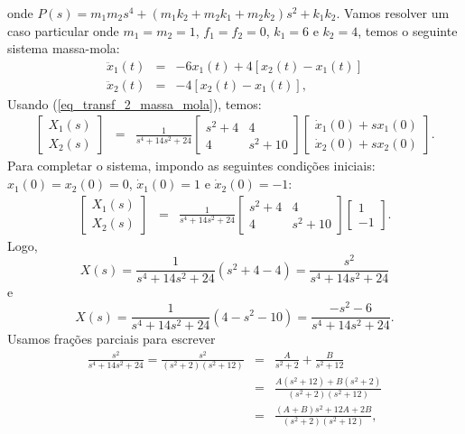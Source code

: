 onde $P(s)=m_1m_2s^4+(m_1k_2+m_2k_1+m_2k_2)s^2+k_1k_2$. Vamos resolver um caso particular onde $m_1=m_2=1$, $f_1=f_2=0$, $k_1=6$ e $k_2=4$, temos o seguinte sistema massa-mola:
\begin{eqnarray*}
  \ddot{x}_1(t) &=&  - 6 x_1(t) + 4\left[x_2(t)-x_1(t)\right]\\
 \ddot{x}_2(t) &=&  - 4\left[x_2(t)-x_1(t)\right],
\end{eqnarray*}
Usando (\ref{eq_transf_2_massa_mola}), temos:
\begin{eqnarray*}
\left[\begin{array}{c}
       X_1(s)\\
       X_2(s)
      \end{array}
\right]
&=&\frac{1}{s^4+14s^2+24}
\left[\begin{array}{cc}
       s^2+4 & 4\\
 4&       s^2+10
      \end{array}
\right]
\left[\begin{array}{c}
\dot{x}_1(0)+sx_1(0)\\  
\dot{x}_2(0)+sx_2(0)
       \end{array}
\right].
\end{eqnarray*}
Para completar o sistema, impondo as seguintes condições iniciais: $x_1(0)=x_2(0)=0$, $\dot{x}_1(0)=1$ e $\dot{x}_2(0)=-1$:
\begin{eqnarray*}
\left[\begin{array}{c}
       X_1(s)\\
       X_2(s)
      \end{array}
\right]
&=&\frac{1}{s^4+14s^2+24}
\left[\begin{array}{cc}
       s^2+4 & 4\\
 4&       s^2+10
      \end{array}
\right]
\left[\begin{array}{c}
1\\  
-1
       \end{array}
\right].
\end{eqnarray*}
Logo,
\begin{equation}
X(s)=\frac{1}{s^4+14s^2+24}\left(s^2+4-4\right)=\frac{s^2}{s^4+14s^2+24}
\end{equation}
e
\begin{equation}
X(s)=\frac{1}{s^4+14s^2+24}\left(4-s^2-10\right)=\frac{-s^2-6}{s^4+14s^2+24}.
\end{equation}
Usamos frações parciais para escrever
\begin{eqnarray*}
\frac{s^2}{s^4+14s^2+24}=\frac{s^2}{(s^2+2)(s^2+12)}&=&\frac{A}{s^2+2}+\frac{B}{s^2+12}\\&=&\frac{A(s^2+12)+B(s^2+2)}{(s^2+2)(s^2+12)}\\
&=&\frac{(A+B)s^2+12A+2B}{(s^2+2)(s^2+12)},
\end{eqnarray*}
